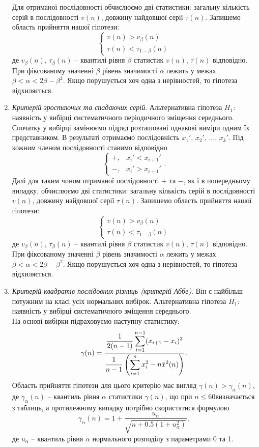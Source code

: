 \begin{enumerate}
	Для отриманої послідовності обчислюємо дві статистики: загальну кількість серій в послідовності $v(n)$, довжину найдовшої серії $\tau(n)$. Запишемо область прийняття нашої гіпотези: \[ \left\{ \begin{matrix} v(n) > v_\beta(n) \\
 \tau(n) < \tau_{1-\beta}(n) \end{matrix} \right. \] 
	де $v_\beta(n)$, $\tau_\beta(n)$ -- квантилі рівня $\beta$ статистик $v(n)$, $\tau(n)$ відповідно. При фіксованому значенні $\beta$ рівень значимості $\alpha$ лежить у межах $\beta < \alpha < 2\beta - \beta^2$. Якщо порушується хоч одна з нерівностей, то гіпотеза відхиляється.
	\item \textit{Критерій зростаючих та спадаючих серій}. Альтернативна гіпотеза $H_1$: наявність у вибірці систематичного періодичного зміщення середнього. Спочатку у вибірці замінюємо підряд розташовані однакові виміри одним їх представником. В результаті отримаємо послідовність $x_1'$, $x_2'$, $\ldots$, $x_k'$. Під кожним членом послідовності ставимо відповідно \[ \begin{cases} +, & x_i' < x_{i+1}' \\
 -, & x_i' > x_{i+1}' \end{cases}. \]
	Далі для таким чином отриманої послідовності $+$ та $-$, як і в попередньому випадку, обчислюємо дві статистики: загальну кількість серій в послідовності $v(n)$, довжину найдовшої серії $\tau(n)$. Запишемо область прийняття нашої гіпотези: \[ \left\{ \begin{matrix} v(n) > v_\beta(n) \\
 \tau(n) < \tau_{1-\beta}(n) \end{matrix} \right. \] де $v_\beta(n)$, $\tau_\beta(n)$ -- квантилі рівня $\beta$ статистик $v(n)$, $\tau(n)$ відповідно. При фіксованому значенні $\beta$ рівень значимості $\alpha$ лежить у межах $\beta < \alpha < 2\beta - \beta^2$. Якщо порушується хоч одна з нерівностей, то гіпотеза відхиляється.
	\item \textit{Критерій квадратів послідовних різниць (критерій Аббе)}. Він є найбільш потужним на класі усіх нормальних вибірок. Альтернативна гіпотеза $H_1$: наявність у вибірці систематичного зміщення середнього. \\

	На основі вибірки підраховуємо наступну статистику: \[ \gamma(n) = \dfrac{\dfrac{1}{2(n-1)} \displaystyle\sum\limits_{i=1}^{n-1} (x_{i+1}-x_i)^2}{\dfrac{1}{n-1}\left(\displaystyle\sum\limits_{i=1}^n x_i^2 - n \bar{x}^2(n)\right)}. \]
	Область прийняття гіпотези для цього критерію має вигляд $\gamma(n) > \gamma_\alpha(n)$, де $\gamma_\alpha(n)$ -- квантиль рівня $\alpha$ статистики $\gamma(n)$, що при $n \le 60 $визначається з таблиць, а протилежному випадку потрібно скористатися формулою \[\gamma_\alpha(n) = 1 + \dfrac{u_\alpha}{\sqrt{n + 0.5(1 + u_\alpha^2)}}, \] де $u_\alpha$ -- квантиль рівня $\alpha$ нормального розподілу з параметрами 0 та 1.
\end{enumerate}